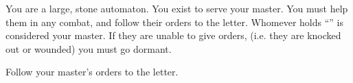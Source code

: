 \documentclass[char]{guildcamp2}
\begin{document}
\name{\cGolem{}}

You are a large, stone automaton. You exist to serve your master. You must help them in any combat, and follow their orders to the letter. Whomever holds ``\iGolemControlRod{}'' is considered your master. If they are unable to give orders, (i.e. they are knocked out or wounded) you must go dormant.	
	
	\begin{itemz}[Goals]
  \item Follow your master's orders to the letter.
\end{itemz}
\end{document}
